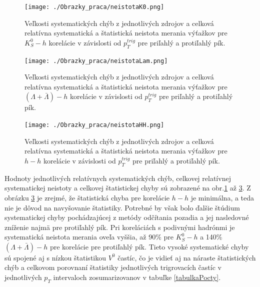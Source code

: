 \documentclass[thesismargins, thesislinespacing]{rnthesis}
\begin{document}
 \begin{figure}[hbtp!]
	\centering
 	\texttt{[image: ./Obrazky\_praca/neistotaK0.png]}
 	\caption{ Veľkosti systematických chýb z jednotlivých zdrojov a celková relatívna systematická a štatistická neistota  merania výťažkov pre $K^0_S-h$ korelácie v závislosti od $p_{T}^{trig}$ pre priľahlý a protiľahlý pík.}
 	\label{systK0}
 \end{figure}

 \begin{figure}[hbtp!]
	\centering
	\texttt{[image: ./Obrazky\_praca/neistotaLam.png]}
	\caption{Veľkosti systematických chýb z jednotlivých zdrojov a celková relatívna systematická a štatistická neistota  merania výťažkov pre $(\Lambda+\bar{\Lambda})-h$ korelácie v závislosti od $p_{T}^{trig}$ pre priľahlý a protiľahlý pík.}
	\label{systLam}
\end{figure}

 \begin{figure}[hbtp!]
	\centering
	\texttt{[image: ./Obrazky\_praca/neistotaHH.png]}
	\caption{ Veľkosti systematických chýb z jednotlivých zdrojov a celková relatívna systematická a štatistická neistota  merania výťažkov pre $h-h$ korelácie v závislosti od $p_{T}^{trig}$ pre priľahlý a protiľahlý pík.}
	\label{systHH}
\end{figure}

Hodnoty jednotlivých relatívnych systematických chýb, celkovej relatívnej systematickej neistoty a celkovej štatistickej chyby sú zobrazené na obr.\ref{systK0} až \ref{systHH}. Z obrázku \ref{systHH} je zrejmé, že štatistická chyba pre korelácie $h-h$ je minimálna, a teda nie je dôvod na navyšovanie štatistiky. Potrebné by však bolo ďalšie štúdium systematickej chyby pochádzajúcej z metódy odčítania pozadia a jej nasledovné zníženie najmä pre protiľahlý pík. Pri koreláciách s podivnými hadrónmi je systematická neistota merania oveľa vyššia, až 90\% pre $K^0_S-h$  a 140\% $(\Lambda+\bar{\Lambda})-h$ pre korelácie pre protiľahlý pík. Tieto vysoké systematické chyby sú spojené aj s nízkou štatistikou $V^0$ častíc, čo je vidieť aj na náraste štatistických chýb a celkovom porovnaní štatistiky jednotlivých trigrovacích častíc v jednotlivých $p_T$ intervaloch zosumarizovanov v tabuľke \ref{tabulkaPocty}.   
\end{document}
